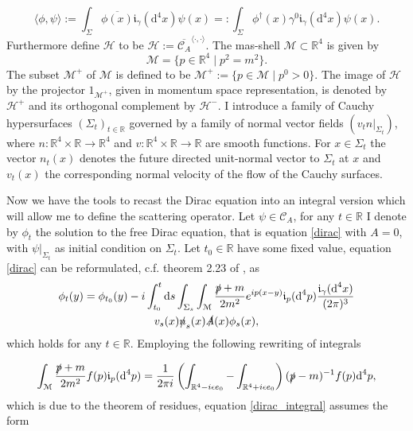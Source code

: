 \documentclass[b5paper,draft,openbib,12pt]{memoir}
\begin{document}
\begin{equation}
\langle \phi, \psi \rangle := \int_{\Sigma} \overline{\phi (x)} \mathfrak{i}_{\gamma} (\mathrm{d}^4x) \psi (x)=: \int_{\Sigma} \phi^\dagger (x) \gamma^0 \mathfrak{i}_{\gamma} (\mathrm{d}^4x) \psi (x) .
\end{equation}
Furthermore define \(\mathcal{H}\) to be \(\mathcal{H}:=\overline{\mathcal{C}_A}^{\langle \cdot, \cdot \rangle}\). The mas-shell \(\mathcal{M}\subset \mathbb{R}^4\) is given by
\begin{equation}
\mathcal{M}=\{p\in \mathbb{R}^4\mid p^2=m^2\}.
\end{equation}
The subset \(\mathcal{M}^+\) of \(\mathcal{M}\) is defined to be \(\mathcal{M}^+:=\{p\in\mathcal{M}\mid p^0>0\}\). The image  of \(\mathcal{H}\) by the projector \(1_{\mathcal{M^+}}\), given in momentum space representation, is denoted by \(\mathcal{H}^+\) and its orthogonal complement by \(\mathcal{H}^-\). 
I introduce a family of Cauchy hypersurfaces \((\Sigma_t)_{t\in\mathbb{R}}\) governed by a family of normal vector fields \((\left.v_t n\right|_{\Sigma_t})\), where \(n: \mathbb{R}^4 \times \mathbb{R} \rightarrow \mathbb{R}^4\) and \(v: \mathbb{R}^4 \times \mathbb{R} \rightarrow \mathbb{R}\) are smooth functions. For \(x\in\Sigma_t\) the vector \(n_t(x)\) denotes the future directed unit-normal vector to \(\Sigma_t\) at \(x\) and \(v_t(x)\) the corresponding normal velocity of the flow of the Cauchy surfaces. 

Now we have the tools to recast the Dirac equation into an integral version
which will allow me to define the scattering operator. 
Let \(\psi \in \mathcal{C}_A\), for any \(t\in\mathbb{R}\) I denote by \(\phi_t\) the solution to the free Dirac equation, that is equation \eqref{dirac} with \(A=0\), with \(\left.\psi\right|_{\Sigma_t}\) as initial condition on \(\Sigma_t\). Let \(t_0\in\mathbb{R}\) have some fixed value, equation \eqref{dirac} can be reformulated, c.f. theorem 2.23 of \cite{ivp1}, as
\begin{multline}\label{dirac_integral}
\phi_t(y)=\phi_{t_0}(y)
-i \int_{t_0}^t \text{d}s \int_{\Sigma_s}\int_{\mathcal{M}}\frac{\slashed{p}+m}{2m^2}e^{ip(x-y)}\mathfrak{i}_p(\text{d}^4p) \frac{\mathfrak{i}_{\gamma}(\text{d}^4x)}{(2\pi)^{3}}\\
v_s(x)\slashed{n}_s(x) \slashed{A}(x)\phi_s(x),
\end{multline}
which holds for any \(t\in\mathbb{R}\). Employing the following rewriting of integrals

\begin{equation}
\int_{\mathcal{M}}\frac{\slashed{p}+m}{2 m^2} f(p) \mathfrak{i}_p(\text{d}^4p)=\frac{1}{2\pi i}   \left( \int_{\mathbb{R}^4-i \epsilon e_0}-\int_{\mathbb{R}^4+i \epsilon e_0} \right) (\slashed{p}-m)^{-1} f(p)  \text{d}^4p,
\end{equation}
which is due to the theorem of residues, equation \eqref{dirac_integral} assumes the form
\end{document}
